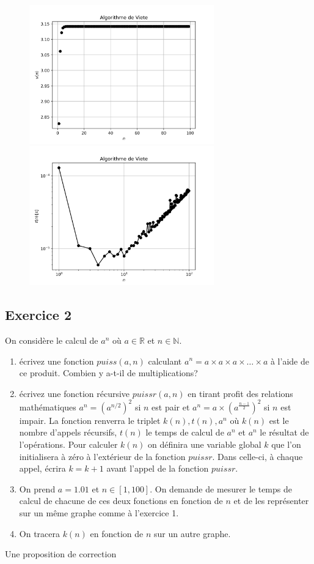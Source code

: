 \documentclass[a4paper,12pt]{article}
\begin{document}
\begin{figure}[htbp]
\includegraphics[width=8cm]{./2024/viete-val.png}
\includegraphics[width=8cm]{./2024/viete-tim.png}
\end{figure}

\clearpage
\subsection{Exercice 2}
\begin{leftbar}
On consid\`ere le calcul de $a^n$ o\`u $a\in\mathbb{R}$ et $n\in\mathbb{N}$.
\begin{enumerate}
\item \'ecrivez une fonction $puiss(a,n)$ calculant $a^n=a\times a\times a\times \ldots \times a$ \`a l'aide de ce produit.  Combien y a-t-il de multiplications? 
\item \'ecrivez une fonction r\'ecursive $puissr(a,n)$ en tirant profit des relations math\'ematiques 
$a^n=(a^{n/2})^2$ si $n$ est pair et $a^n=a\times \left(a^{\frac{n-1}{2}}\right)^2$ si $n$ est impair.  La fonction renverra le triplet $k(n),t(n),a^n$ o\`u $k(n)$ est le nombre d'appels r\'ecursifs, $t(n)$  le temps de calcul de $a^n$ et $a^n$ le r\'esultat de l'op\'erations.  Pour calculer $k(n)$ on d\'efinira une variable global $k$ que l'on initialisera \`a z\'ero \`a l'ext\'erieur de la fonction $puissr$. Dans celle-ci, \`a chaque appel, \'ecrira $k=k+1$ avant l'appel de la fonction  $puissr$. 
\item On prend $a=1.01$ et $n\in\left[1,100\right]$. On demande de mesurer le temps de calcul de chacune de ces deux fonctions en fonction de $n$ et de les repr\'esenter sur un m\^eme graphe comme \`a l'exercice 1.
\item On tracera $k(n)$ en fonction de $n$ sur un autre graphe.
\end{enumerate}
\end{leftbar}
Une proposition de correction

\end{document}
